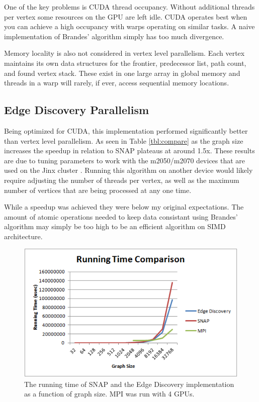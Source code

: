 \documentclass[10pt,twocolumn]{article}
\begin{document}
One of the key problems is CUDA thread occupancy. Without additional threads per vertex some resources on the GPU are left idle. CUDA operates best when you can achieve a high occupancy with warps operating on similar tasks. A naive implementation of Brandes' algorithm simply has too much divergence.

Memory locality is also not considered in vertex level parallelism. Each vertex maintains its own data structures for the frontier, predecessor list, path count, and found vertex stack. These exist in one large array in global memory and threads in a warp will rarely, if ever, access sequential memory locations.

\subsection{Edge Discovery Parallelism}
Being optimized for CUDA, this implementation performed significantly better than vertex level parallelism. As seen in Table \ref{tbl:compare} as the graph size increases the speedup in relation to SNAP plateaus at around 1.5x. These results are due to tuning parameters to work with the m2050/m2070 devices that are used on the Jinx cluster \cite{jinx}. Running this algorithm on another device would likely require adjusting the number of threads per vertex, as well as the maximum number of vertices that are being processed at any one time.

While a speedup was achieved they were below my original expectations. The amount of atomic operations needed to keep data consistant using Brandes' algorithm may simply be too high to be an efficient algorithm on SIMD architecture.

\begin{figure}[htbp]
\centering
\includegraphics[scale=.6]{runningTime.png}
\caption{The running time of SNAP and the Edge Discovery implementation as a function of graph size. MPI was run with 4 GPUs.}
\label{fig:runningTime}
\end{figure}
\end{document}
